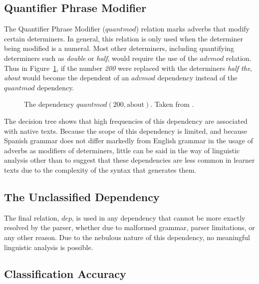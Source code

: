 \documentclass[main.tex]{subfiles}
\begin{document}
\subsection{Quantifier Phrase Modifier}

The Quantifier Phrase Modifier ($quantmod$) relation marks adverbs that modify certain determiners. In general, this relation is only used when the determiner being modified is a numeral. Most other determiners, including quantifying determiners such as \textit{double} or \textit{half}, would require the use of the $advmod$ relation. Thus in Figure~\ref{ex:quantmod}, if the number \textit{200} were replaced with the determiners \textit{half the}, \textit{about} would become the dependent of an $advmod$ dependency instead of the $quantmod$ dependency.

\begin{figure}[h]
\centering
{}
\caption{The dependency $quantmod(\text{200},\text{about})$. Taken from \citet{typed-deps-manual}.}
\label{ex:quantmod}
\end{figure}

The decision tree shows that high frequencies of this dependency are associated with native texts. Because the scope of this dependency is limited, and because Spanish grammar does not differ markedly from English grammar in the usage of adverbs as modifiers of determiners, little can be said in the way of linguistic analysis other than to suggest that these dependencies are less common in learner texts due to the complexity of the syntax that generates them.

\subsection{The Unclassified Dependency}

The final relation, $dep$, is used in any dependency that cannot be more exactly resolved by the parser, whether due to malformed grammar, parser limitations, or any other reason. Due to the nebulous nature of this dependency, no meaningful linguistic analysis is possible. 

\subsection{Classification Accuracy}
\end{document}
